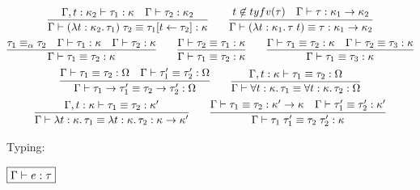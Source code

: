 \begin{gather*}
  \infer{\Gamma \vdash (\lambda t: \kappa_2\ldotp \tau_1)\; \tau_2 \equiv \tau_1[t \assign \tau_2]: \kappa}{
    \Gamma, t: \kappa_2 \vdash \tau_1: \kappa
    &
    \Gamma \vdash \tau_2: \kappa_2
  }
  \hspace{2em}
  \infer{\Gamma \vdash (\lambda t: \kappa_1\ldotp \tau\; t) \equiv \tau: \kappa_1 \to \kappa_2}{
    t \not\in \typefreevar(\tau)
    &
    \Gamma \vdash \tau: \kappa_1 \to \kappa_2
  }
  \\
  \infer{\Gamma \vdash \tau_1 \equiv \tau_2: \kappa}{
    \tau_1 \equiv_\alpha \tau_2
    &
    \Gamma \vdash \tau_1: \kappa
    &
    \Gamma \vdash \tau_2: \kappa
  }
  \hspace{2em}
  \infer{\Gamma \vdash \tau_1 \equiv \tau_2: \kappa}{
    \Gamma \vdash \tau_2 \equiv \tau_1: \kappa
  }
  \hspace{2em}
  \infer{\Gamma \vdash \tau_1 \equiv \tau_3: \kappa}{
    \Gamma \vdash \tau_1 \equiv \tau_2: \kappa
    &
    \Gamma \vdash \tau_2 \equiv \tau_3: \kappa
  }
  \\
  \infer{\Gamma \vdash \tau_1 \to \tau'_1 \equiv \tau_2 \to \tau'_2: \Omega}{
    \Gamma \vdash \tau_1 \equiv \tau_2: \Omega
    &
    \Gamma \vdash \tau'_1 \equiv \tau'_2: \Omega
  }
  \hspace{2em}
  \infer{\Gamma \vdash \forall t: \kappa\ldotp \tau_1 \equiv \forall t: \kappa\ldotp \tau_2: \Omega}{
    \Gamma, t: \kappa \vdash \tau_1 \equiv \tau_2: \Omega
  }
  \\
  \infer{\Gamma \vdash \lambda t: \kappa\ldotp \tau_1 \equiv \lambda t: \kappa\ldotp \tau_2: \kappa \to \kappa'}{
    \Gamma, t: \kappa \vdash \tau_1 \equiv \tau_2: \kappa'
  }
  \hspace{2em}
  \infer{\Gamma \vdash \tau_1\; \tau'_1 \equiv \tau_2\; \tau'_2: \kappa}{
    \Gamma \vdash \tau_1 \equiv \tau_2: \kappa' \to \kappa
    &
    \Gamma \vdash \tau'_1 \equiv \tau'_2: \kappa'
  }
\end{gather*}

Typing:

$\fbox{$\Gamma \vdash e: \tau$}$

